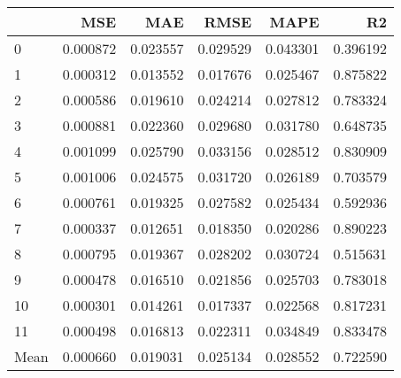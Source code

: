\begin{tabular}{lrrrrr}
\toprule
 & MSE & MAE & RMSE & MAPE & R2 \\
\midrule
0 & 0.000872 & 0.023557 & 0.029529 & 0.043301 & 0.396192 \\
1 & 0.000312 & 0.013552 & 0.017676 & 0.025467 & 0.875822 \\
2 & 0.000586 & 0.019610 & 0.024214 & 0.027812 & 0.783324 \\
3 & 0.000881 & 0.022360 & 0.029680 & 0.031780 & 0.648735 \\
4 & 0.001099 & 0.025790 & 0.033156 & 0.028512 & 0.830909 \\
5 & 0.001006 & 0.024575 & 0.031720 & 0.026189 & 0.703579 \\
6 & 0.000761 & 0.019325 & 0.027582 & 0.025434 & 0.592936 \\
7 & 0.000337 & 0.012651 & 0.018350 & 0.020286 & 0.890223 \\
8 & 0.000795 & 0.019367 & 0.028202 & 0.030724 & 0.515631 \\
9 & 0.000478 & 0.016510 & 0.021856 & 0.025703 & 0.783018 \\
10 & 0.000301 & 0.014261 & 0.017337 & 0.022568 & 0.817231 \\
11 & 0.000498 & 0.016813 & 0.022311 & 0.034849 & 0.833478 \\
Mean & 0.000660 & 0.019031 & 0.025134 & 0.028552 & 0.722590 \\
\bottomrule
\end{tabular}
